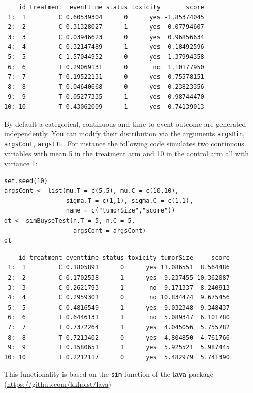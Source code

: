 \documentclass[12pt]{article}
\begin{document}
\begin{verbatim}
    id treatment  eventtime status toxicity       score
 1:  1         C 0.60539304      0      yes -1.85374045
 2:  2         C 0.31328027      1      yes -0.07794607
 3:  3         C 0.03946623      0      yes  0.96856634
 4:  4         C 0.32147489      1      yes  0.18492596
 5:  5         C 1.57044952      0      yes -1.37994358
 6:  6         T 0.29069131      0       no  1.10177950
 7:  7         T 0.19522131      0      yes  0.75578151
 8:  8         T 0.04640668      0      yes -0.23823356
 9:  9         T 0.05277335      1      yes  0.98744470
10: 10         T 0.43062009      1      yes  0.74139013
\end{verbatim}

By default a categorical, continuous and time to event outcome are
generated independently. You can modify their distribution via the
arguments \texttt{argsBin}, \texttt{argsCont}, \texttt{argsTTE}. For instance the following
code simulates two continuous variables with mean 5 in the treatment
arm and 10 in the control arm all with variance 1:
\lstset{language=r,label= ,caption= ,captionpos=b,numbers=none}
\begin{lstlisting}
set.seed(10)
argsCont <- list(mu.T = c(5,5), mu.C = c(10,10), 
                 sigma.T = c(1,1), sigma.C = c(1,1),
                 name = c("tumorSize","score"))
dt <- simBuyseTest(n.T = 5, n.C = 5,
                   argsCont = argsCont)
dt
\end{lstlisting}

\begin{verbatim}
    id treatment eventtime status toxicity tumorSize     score
 1:  1         C 0.1805891      0      yes 11.086551  8.564486
 2:  2         C 0.1702538      1      yes  9.237455 10.362087
 3:  3         C 0.2621793      1       no  9.171337  8.240913
 4:  4         C 0.2959301      0       no 10.834474  9.675456
 5:  5         C 0.4816549      1      yes  9.032348  9.348437
 6:  6         T 0.6446131      1       no  5.089347  6.101780
 7:  7         T 0.7372264      1      yes  4.045056  5.755782
 8:  8         T 0.7213402      0      yes  4.804850  4.761766
 9:  9         T 0.1580651      1      yes  5.925521  5.987445
10: 10         T 0.2212117      0      yes  5.482979  5.741390
\end{verbatim}

This functionality is based on the \texttt{sim} function of the \textbf{lava}
package (\url{https://github.com/kkholst/lava})

\clearpage
\end{document}
